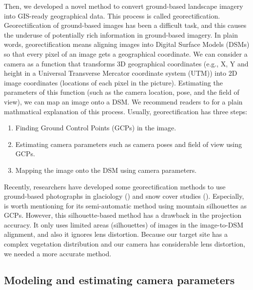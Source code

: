 \documentclass{article}
\providecommand{\tightlist}{%
  \setlength{\itemsep}{0pt}\setlength{\parskip}{0pt}}
\begin{document}
Then, we developed a novel method to convert ground-based landscape imagery into GIS-ready geographical data. This process is called georectification. Georectification of ground-based images has been a difficult task, and this causes the underuse of potentially rich information in ground-based imagery. In plain words, georectification means aligning images into Digital Surface Models (DSMs) so that every pixel of an image gets a geographical coordinate. We can consider a camera as a function that transforms 3D geographical coordinates (e.g., X, Y and height in a Universal Transverse Mercator coordinate system (UTM)) into 2D image coordinates (locations of each pixel in the picture). Estimating the parameters of this function (such as the camera location, pose, and the field of view), we can map an image onto a DSM. We recommend readers to \cite{Portenier2020Cryosphere} for a plain mathmatical explanation of this process. Usually, georectification has three steps:

\begin{enumerate}
\def\labelenumi{\arabic{enumi}.}
\tightlist
\item
  Finding Ground Control Points (GCPs) in the image.\\
\item
  Estimating camera parameters such as camera poses and field of view using GCPs.\\
\item
  Mapping the image onto the DSM using camera parameters.
\end{enumerate}

Recently, researchers have developed some georectification methods to use ground-based photographs in glaciology (\cite{Messerli2015GeoInst}) and snow cover studies (\cite{Portenier2020Cryosphere}). Especially, \cite{Portenier2020Cryosphere} is worth mentioning for its semi-automatic method using mountain silhouettes as GCPs. However, this silhouette-based method has a drawback in the projection accuracy. It only uses limited areas (silhouettes) of images in the image-to-DSM alignment, and also it ignores lens distortion. Because our target site has a complex vegetation distribution and our camera has considerable lens distortion, we needed a more accurate method.

\hypertarget{modeling-and-estimating-camera-parameters}{%
\subsection{Modeling and estimating camera parameters}\label{modeling-and-estimating-camera-parameters}}
\end{document}
